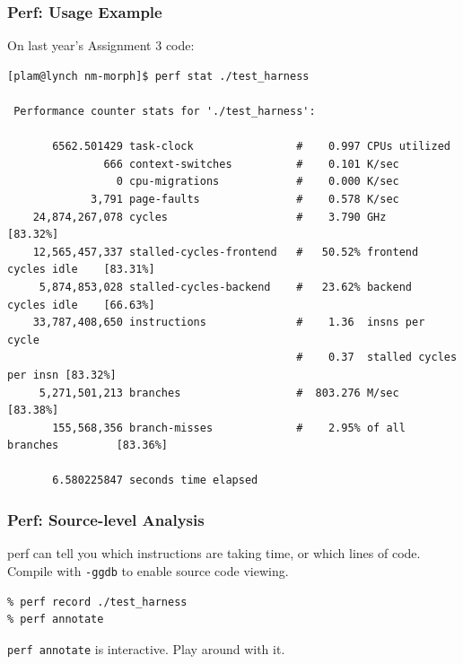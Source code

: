 \begin{frame}[fragile]
  \frametitle{Perf: Usage Example}

On last year's Assignment 3 code:
\begin{lstlisting}[basicstyle=\tiny]
[plam@lynch nm-morph]$ perf stat ./test_harness

 Performance counter stats for './test_harness':

       6562.501429 task-clock                #    0.997 CPUs utilized          
               666 context-switches          #    0.101 K/sec                  
                 0 cpu-migrations            #    0.000 K/sec                  
             3,791 page-faults               #    0.578 K/sec                  
    24,874,267,078 cycles                    #    3.790 GHz                     [83.32%]
    12,565,457,337 stalled-cycles-frontend   #   50.52% frontend cycles idle    [83.31%]
     5,874,853,028 stalled-cycles-backend    #   23.62% backend  cycles idle    [66.63%]
    33,787,408,650 instructions              #    1.36  insns per cycle        
                                             #    0.37  stalled cycles per insn [83.32%]
     5,271,501,213 branches                  #  803.276 M/sec                   [83.38%]
       155,568,356 branch-misses             #    2.95% of all branches         [83.36%]

       6.580225847 seconds time elapsed
\end{lstlisting} %
\end{frame}

\begin{frame}[fragile]
  \frametitle{Perf: Source-level Analysis}


perf can tell you which instructions are taking time, or which lines of code.\\[1em]

Compile with {\tt -ggdb} to enable source code viewing.

\begin{lstlisting}
% perf record ./test_harness
% perf annotate
\end{lstlisting}

{\tt perf annotate} is interactive. Play around with it.


\end{frame}

